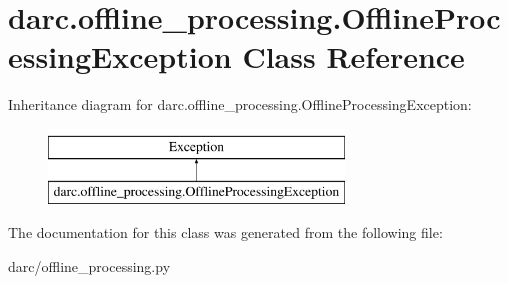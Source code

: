 \hypertarget{classdarc_1_1offline__processing_1_1_offline_processing_exception}{}\section{darc.\+offline\+\_\+processing.\+Offline\+Processing\+Exception Class Reference}
\label{classdarc_1_1offline__processing_1_1_offline_processing_exception}
Inheritance diagram for darc.\+offline\+\_\+processing.\+Offline\+Processing\+Exception\+:\begin{figure}[H]
\begin{center}
\leavevmode
\includegraphics[height=2.000000cm]{classdarc_1_1offline__processing_1_1_offline_processing_exception}
\end{center}
\end{figure}


The documentation for this class was generated from the following file\+:\begin{DoxyCompactItemize}
\item 
darc/offline\+\_\+processing.\+py\end{DoxyCompactItemize}
